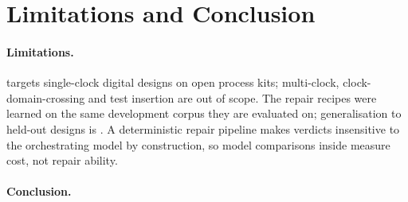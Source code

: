 \section{Limitations and Conclusion}
\label{sec:conclusion}

\paragraph{Limitations.}
\R targets single-clock digital designs on open process kits; multi-clock, clock-domain-crossing and
test insertion are out of scope. The repair recipes were learned on the same development corpus they
are evaluated on; generalisation to held-out designs is . A
deterministic repair pipeline makes verdicts insensitive to the orchestrating model by construction,
so model comparisons inside \R measure cost, not repair ability. 

\paragraph{Conclusion.}

